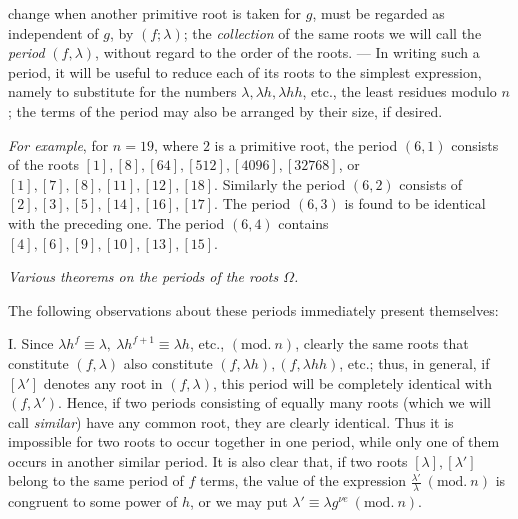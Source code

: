 change when another primitive root is taken for \(g\), must be regarded as independent of \(g\), by \((f;\allowbreak \lambda)\); the \textit{collection} of the same roots we will call the \textit{period} \((f,\allowbreak \lambda)\), without regard to the order of the roots. — In writing such a period, it will be useful to reduce each of its roots to the simplest expression, namely to substitute for the numbers \(\lambda,\allowbreak \lambda h,\allowbreak \lambda hh\), etc., the least residues modulo \(n\); the terms of the period may also be arranged by their size, if desired.

\textit{For example}, for \(n=19\), where \(2\) is a primitive root, the period \((6,\allowbreak 1)\) consists of the roots \([1],\allowbreak [8],\allowbreak [64],\allowbreak [512],\allowbreak [4096],\allowbreak [32768]\), or \([1],\allowbreak [7],\allowbreak [8],\allowbreak [11],\allowbreak [12],\allowbreak [18]\). Similarly the period \((6,\allowbreak 2)\) consists of \([2],\allowbreak [3],\allowbreak [5],\allowbreak [14],\allowbreak [16],\allowbreak [17]\). The period \((6,\allowbreak 3)\) is found to be identical with the preceding one. The period \((6,\allowbreak 4)\) contains \([4],\allowbreak [6],\allowbreak [9],\allowbreak [10],\allowbreak [13],\allowbreak [15]\).

\begin{center}\textit{Various theorems on the periods of the roots \(\Omega\).}\end{center}


The following observations about these periods immediately present themselves:

I. Since \(\lambda h^f\equiv\lambda,\allowbreak \ \lambda h^{f+1}\equiv\lambda h\), etc., \((\mathrm{mod.}\ n)\), clearly the same roots that constitute \((f,\allowbreak \lambda)\) also constitute \((f,\allowbreak \lambda h),\allowbreak (f,\allowbreak \lambda hh)\), etc.; thus, in general, if \([\lambda']\) denotes any root in \((f,\allowbreak \lambda)\), this period will be completely identical with \((f,\allowbreak \lambda')\). Hence, if two periods consisting of equally many roots (which we will call \textit{similar}) have any common root, they are clearly identical. Thus it is impossible for two roots to occur together in one period, while only one of them occurs in another similar period. It is also clear that, if two roots \([\lambda],\allowbreak [\lambda']\) belong to the same period of \(f\) terms, the value of the expression \(\frac{\lambda'}{\lambda}\ (\mathrm{mod.}\ n)\) is congruent to some power of \(h\), or we may put \(\lambda'\equiv\lambda g^{\nu e}\ (\mathrm{mod.}\ n)\).

